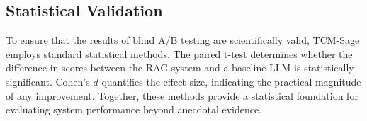 \subsection{Statistical Validation}

To ensure that the results of blind A/B testing are scientifically valid, TCM-Sage employs standard statistical methods. The paired t-test determines whether the difference in scores between the RAG system and a baseline LLM is statistically significant. Cohen's $d$ quantifies the effect size, indicating the practical magnitude of any improvement. Together, these methods provide a statistical foundation for evaluating system performance beyond anecdotal evidence.
